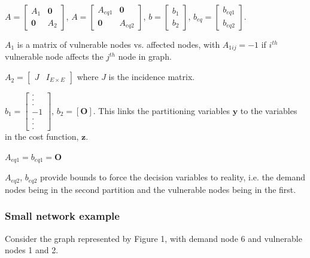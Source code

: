 \documentclass[authoryear,preprint,review,12pt]{elsarticle}
\begin{document}
$A=\left[\begin{array}{cc}
A_{1} & \mathbf{0}\\
\mathbf{0} & A_{2}
\end{array}\right]$, $A=\left[\begin{array}{cc}
A_{eq1} & \mathbf{0}\\
\mathbf{0} & A_{eq2}
\end{array}\right]$, $b=\left[\begin{array}{c}
b_{1}\\
b_{2}
\end{array}\right]$, $b_{eq}=\left[\begin{array}{c}
b_{eq1}\\
b_{eq2}
\end{array}\right]$.

$A_{1}$ is a matrix of vulnerable nodes vs. affected nodes, with
$A_{1ij}=-1$ if $i^{th}$ vulnerable node affects the $j^{th}$ node
in graph.

$A_{2}=\left[\begin{array}{cc}

J & I_{E\times E}\end{array}\right]$ where $J$ is the incidence matrix.


$b_{1}=\left[\begin{array}{c}
.\\
.\\
.\\
-1\\
.\\
.\\
.
\end{array}\right]$,
$b_{2}=\left[\mathbf{O}\right]$. This links the partitioning variables
$\mathbf{y}$ to the variables in the cost function, $\mathbf{z}$.


$A_{eq1}=b_{eq1}=\mathbf{O}$


$A_{eq2}$, $b_{eq2}$ provide bounds to force the decision variables
to reality, i.e. the demand nodes being in the second partition and
the vulnerable nodes being in the first.


\subsubsection*{Small network example}

Consider the graph represented by Figure 1, with demand node 6 and
vulnerable nodes 1 and 2.
\end{document}
